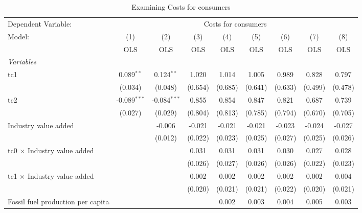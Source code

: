 
\begin{table}[htbp]
   \caption{Examining Costs for consumers}
   \centering
   \begin{tabular}{lcccccccc}
      \toprule
      Dependent Variable: & \multicolumn{8}{c}{Costs for consumers}\\
      Model:                                  & (1)            & (2)            & (3)     & (4)     & (5)     & (6)     & (7)     & (8)\\  
                                              &  OLS           & OLS            & OLS     & OLS     & OLS     & OLS     & OLS     & OLS\\  
      \midrule
      \emph{Variables}\\
      tc1                                     & 0.089$^{**}$   & 0.124$^{**}$   & 1.020   & 1.014   & 1.005   & 0.989   & 0.828   & 0.797\\   
                                              & (0.034)        & (0.048)        & (0.654) & (0.685) & (0.641) & (0.633) & (0.499) & (0.478)\\   
      tc2                                     & -0.089$^{***}$ & -0.084$^{***}$ & 0.855   & 0.854   & 0.847   & 0.821   & 0.687   & 0.739\\   
                                              & (0.027)        & (0.029)        & (0.804) & (0.813) & (0.785) & (0.794) & (0.670) & (0.705)\\   
      Industry value added                    &                & -0.006         & -0.021  & -0.021  & -0.021  & -0.023  & -0.024  & -0.027\\   
                                              &                & (0.012)        & (0.022) & (0.023) & (0.025) & (0.027) & (0.025) & (0.026)\\   
      tc0 $\times$ Industry value added       &                &                & 0.031   & 0.031   & 0.031   & 0.030   & 0.027   & 0.028\\   
                                              &                &                & (0.026) & (0.027) & (0.026) & (0.026) & (0.022) & (0.023)\\   
      tc1 $\times$ Industry value added       &                &                & 0.002   & 0.002   & 0.002   & 0.002   & 0.002   & 0.004\\   
                                              &                &                & (0.020) & (0.021) & (0.021) & (0.022) & (0.020) & (0.021)\\   
      Fossil fuel production per capita       &                &                &         & 0.002   & 0.003   & 0.004   & 0.005   & 0.003\\   

\end{tabular}
\end{table}
